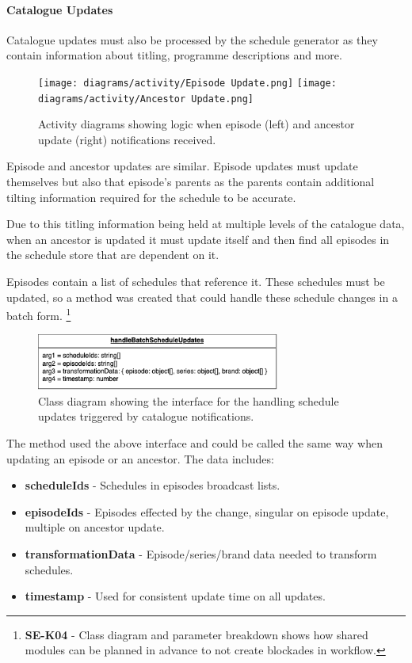   \newpage
  \paragraph{Catalogue Updates}
  Catalogue updates must also be processed by the schedule generator as they contain information about titling, programme descriptions and more.

  \begin{figure}[H]
    \centering
    \texttt{[image: diagrams/activity/Episode Update.png]}
    \texttt{[image: diagrams/activity/Ancestor Update.png]}
    \caption{Activity diagrams showing logic when episode (left) and ancestor update (right) notifications received.}
    \label{fig:scheduleUpdateCatalogueActivity}
  \end{figure}

  Episode and ancestor updates are similar. Episode updates must update themselves but also that episode's parents as
  the parents contain additional tilting information required for the schedule to be accurate.

  Due to this titling information being held at multiple levels of the catalogue data, when an ancestor is updated it must update itself
  and then find all episodes in the schedule store that are dependent on it.

  Episodes contain a list of schedules that reference it. These schedules must be updated, so a method was created that could handle these
  schedule changes in a batch form.
  \footnote{\textbf{SE-K04} - Class diagram and parameter breakdown shows how shared modules can be planned in advance to not create 
  blockades in workflow.}

  \begin{figure}[H]
    \centering
    \includegraphics[width=8cm]{assets/handleBatchScheduleInterface.drawio.png}
    \caption{Class diagram showing the interface for the handling schedule updates triggered by catalogue notifications.}
    \label{fig:catalogueTriggeredScheduleUpdateClass}
  \end{figure}

  The method used the above interface and could be called the same way when updating an episode or an ancestor. The data includes:
  \begin{itemize}
    \item \textbf{scheduleIds} - Schedules in episodes broadcast lists.
    \item \textbf{episodeIds} - Episodes effected by the change, singular on episode update, multiple on ancestor update.
    \item \textbf{transformationData} - Episode/series/brand data needed to transform schedules.
    \item \textbf{timestamp} - Used for consistent update time on all updates.
  \end{itemize}

